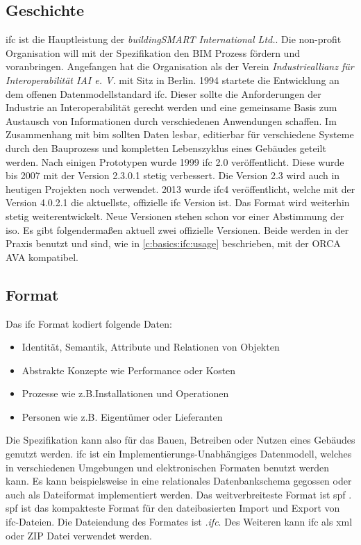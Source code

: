\subsection{Geschichte}
\label{c:basics:ifc:history}
\ac{ifc} ist die Hauptleistung der \textit{buildingSMART International Ltd.}. Die non-profit Organisation will mit der Spezifikation den BIM Prozess fördern und voranbringen. \citep[vgl.][]{BuildingSMART_IFC}
Angefangen hat die Organisation als der Verein \textit{Industrieallianz für Interoperabilität IAI e. V.} mit Sitz in Berlin. 1994 startete die Entwicklung an dem offenen Datenmodellstandard \ac{ifc}. Dieser sollte die Anforderungen der Industrie an Interoperabilität gerecht werden und eine gemeinsame Basis zum Austausch von Informationen durch verschiedenen Anwendungen schaffen. Im Zusammenhang mit \ac{bim} sollten Daten lesbar, editierbar für verschiedene Systeme durch den Bauprozess und kompletten Lebenszyklus eines Gebäudes geteilt werden. \citep[vgl.][]{Laakso2012-oi} Nach einigen Prototypen wurde 1999 \ac{ifc} 2.0 veröffentlicht. Diese wurde bis 2007 mit der Version 2.3.0.1 stetig verbessert. Die Version 2.3 wird auch in heutigen Projekten noch verwendet. 2013 wurde \ac{ifc}4 veröffentlicht, welche mit der Version 4.0.2.1 die aktuellste, offizielle \ac{ifc} Version ist. Das Format wird weiterhin stetig weiterentwickelt. Neue Versionen stehen schon vor einer Abstimmung der \ac{iso}. \citep[vgl.][]{BuildingSMART_history_2022} Es gibt folgendermaßen aktuell zwei offizielle Versionen. Beide werden in der Praxis benutzt und sind, wie in \autoref{c:basics:ifc:usage} beschrieben, mit der ORCA AVA kompatibel.


\subsection{Format}
\label{c:basics:ifc:format}
Das \ac{ifc} Format kodiert folgende Daten:
\begin{itemize}
	\item Identität, Semantik, Attribute und Relationen von Objekten
	\item Abstrakte Konzepte wie Performance oder Kosten
	\item Prozesse wie z.B.Installationen und Operationen
	\item Personen wie z.B. Eigentümer oder Lieferanten
\end{itemize}
Die Spezifikation kann also für das Bauen, Betreiben oder Nutzen eines Gebäudes genutzt werden. \ac{ifc} ist ein Implementierungs-Unabhängiges Datenmodell, welches in verschiedenen Umgebungen und elektronischen Formaten benutzt werden kann. Es kann beispielsweise in eine relationales Datenbankschema gegossen oder auch als Dateiformat implementiert werden. Das weitverbreiteste Format ist \ac{spf} \citep[vgl.][]{Laakso2012-oi,BuildingSMART_IFC}. \ac{spf} ist das kompakteste Format für den dateibasierten Import und Export von \ac{ifc}-Dateien. Die Dateiendung des Formates ist \glqq \textit{.ifc}\grqq{}. Des Weiteren kann \ac{ifc} als \ac{xml} oder ZIP Datei verwendet werden. \citep[vgl.][]{BuildingSMART_IFC}

